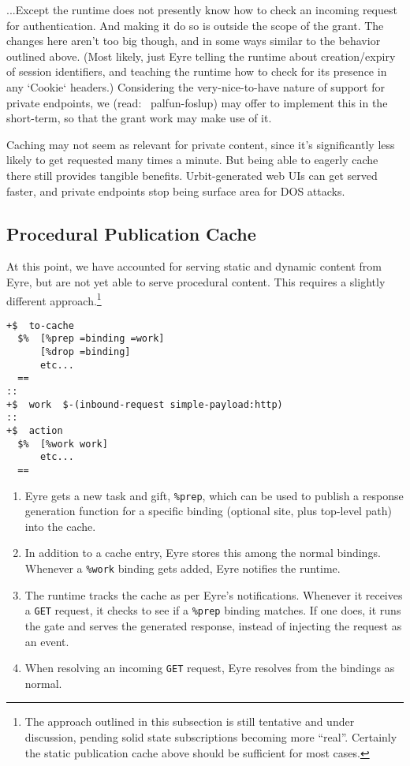 \documentclass[twoside]{article}
\begin{document}
...Except the runtime does not presently know how to check an incoming request for authentication. And making it do so is outside the scope of the grant. The changes here aren't too big though, and in some ways similar to the behavior outlined above. (Most likely, just Eyre telling the runtime about creation/expiry of session identifiers, and teaching the runtime how to check for its presence in any `Cookie` headers.) Considering the very-nice-to-have nature of support for private endpoints, we (read: ~palfun-foslup) may offer to implement this in the short-term, so that the grant work may make use of it.

Caching may not seem as relevant for private content, since it's significantly less likely to get requested many times a minute. But being able to eagerly cache there still provides tangible benefits. Urbit-generated web UIs can get served faster, and private endpoints stop being surface area for DOS attacks.

\subsection{Procedural Publication Cache}

At this point, we have accounted for serving static and dynamic content from Eyre, but are not yet able to serve procedural content. This requires a slightly different approach.\footnote{The approach outlined in this subsection is still tentative and under discussion, pending solid state subscriptions becoming more ``real''. Certainly the static publication cache above should be sufficient for most cases.}

\begin{lstlisting}[style=listingcode]
+$  to-cache
  $%  [%prep =binding =work]
      [%drop =binding]
      etc...
  ==
::
+$  work  $-(inbound-request simple-payload:http)
::
+$  action
  $%  [%work work]
      etc...
  ==
\end{lstlisting}

\begin{enumerate}
  \item  Eyre gets a new task and gift, \lstinline[style=inlinecode]{%prep}, which can be used to publish a response generation function for a specific binding (optional site, plus top-level path) into the cache.
  \item  In addition to a cache entry, Eyre stores this among the normal bindings. Whenever a \lstinline[style=inlinecode]{%work} binding gets added, Eyre notifies the runtime.
  \item  The runtime tracks the cache as per Eyre's notifications. Whenever it receives a \texttt{GET} request, it checks to see if a \lstinline[style=inlinecode]{%prep} binding matches. If one does, it runs the gate and serves the generated response, instead of injecting the request as an event.
  \item  When resolving an incoming \texttt{GET} request, Eyre resolves from the bindings as normal.
\end{enumerate}
\end{document}
